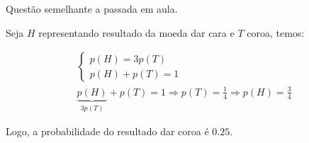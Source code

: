 \item
Questão semelhante a passada em aula.

Seja $H$ representando resultado da moeda dar cara e $T$ coroa, temos:

\[\begin{array}{l}
\left\{ \begin{array}{l}
p(H) = 3p(T)\\
p(H) + p(T) = 1
\end{array} \right.\\
\underbrace {p(H)}_{3p(T)} + p(T) = 1 \Rightarrow p(T) = \frac{1}{4} \Rightarrow p(H) = \frac{3}{4}
\end{array}\]

Logo, a probabilidade do resultado dar coroa é $0.25$.
